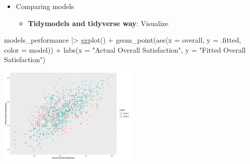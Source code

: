 \documentclass[
  ignorenonframetext,
]{beamer}
\newenvironment{Shaded}{\begin{snugshade}}{\end{snugshade}}
\newcommand{\AttributeTok}[1]{\textcolor[rgb]{0.40,0.45,0.13}{#1}}
\newcommand{\FunctionTok}[1]{\textcolor[rgb]{0.28,0.35,0.67}{#1}}
\newcommand{\NormalTok}[1]{\textcolor[rgb]{0.00,0.23,0.31}{#1}}
\newcommand{\SpecialCharTok}[1]{\textcolor[rgb]{0.37,0.37,0.37}{#1}}
\newcommand{\StringTok}[1]{\textcolor[rgb]{0.13,0.47,0.30}{#1}}
\providecommand{\tightlist}{%
  \setlength{\itemsep}{0pt}\setlength{\parskip}{0pt}}\usepackage{longtable,booktabs,array}
\begin{document}
\begin{frame}[fragile]{}
\label{section-28}
\begin{itemize}
\item
  Comparing models

  \begin{itemize}
  \tightlist
  \item
    \textbf{Tidymodels and tidyverse way}: Visualize
  \end{itemize}
\end{itemize}

\tiny

\begin{Shaded}
\begin{Highlighting}[]
\NormalTok{models\_performance }\SpecialCharTok{|\textgreater{}} 
  \FunctionTok{ggplot}\NormalTok{() }\SpecialCharTok{+}
  \FunctionTok{geom\_point}\NormalTok{(}\FunctionTok{aes}\NormalTok{(}\AttributeTok{x =}\NormalTok{ overall, }\AttributeTok{y =}\NormalTok{ .fitted,}
                 \AttributeTok{color =}\NormalTok{ model)) }\SpecialCharTok{+}
  \FunctionTok{labs}\NormalTok{(}\AttributeTok{x =} \StringTok{"Actual Overall Satisfaction"}\NormalTok{,}
       \AttributeTok{y =} \StringTok{"Fitted Overall Satisfaction"}\NormalTok{)}
\end{Highlighting}
\end{Shaded}

\begin{center}
\includegraphics[width=0.5\textwidth,height=\textheight]{007_identifying_drivers_of_outcomes_linear_models_files/figure-beamer/unnamed-chunk-26-1.pdf}
\end{center}
\end{frame}
\end{document}
